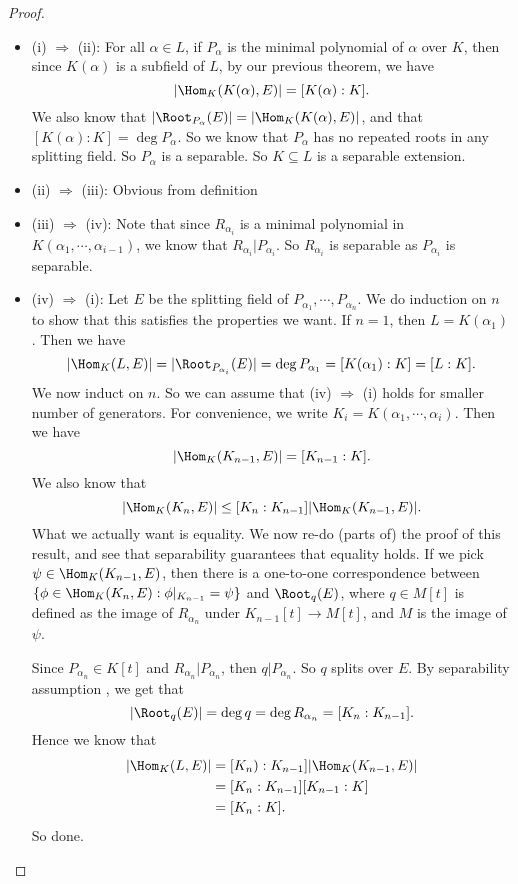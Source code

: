 \documentclass[a4paper]{article}
\begin{document}
\begin{proof}\leavevmode
  \begin{itemize}
    \item (i) $\Rightarrow$ (ii): For all $\alpha \in L$, if $P_\alpha$ is the minimal polynomial of $\alpha$ over $K$, then since $K(\alpha)$ is a subfield of $L$, by our previous theorem, we have
      \[
        |\Hom_K(K(\alpha), E)| = [K(\alpha): K].
      \]
      We also know that $|\Root_{P_\alpha}(E)| = |\Hom_K(K(\alpha), E)|$, and that $[K(\alpha): K] = \deg P_\alpha$. So we know that $P_\alpha$ has no repeated roots in any splitting field. So $P_\alpha$ is a separable. So $K\subseteq L$ is a separable extension.
    \item (ii) $\Rightarrow$ (iii): Obvious from definition
    \item (iii) $\Rightarrow$ (iv): Note that since $R_{\alpha_i}$ is a minimal polynomial in $K(\alpha_1, \cdots, \alpha_{i - 1})$, we know that $R_{\alpha_i} | P_{\alpha_i}$. So $R_{\alpha_i}$ is separable as $P_{\alpha_i}$ is separable.
    \item (iv) $\Rightarrow$ (i): Let $E$ be the splitting field of $P_{\alpha_1}, \cdots, P_{\alpha_n}$. We do induction on $n$ to show that this satisfies the properties we want. If $n = 1$, then $L = K(\alpha_1)$. Then we have
      \[
        |\Hom_K(L, E)| = |\Root_{P_{\alpha_i}}(E)| = \deg P_{\alpha_1} = [K(\alpha_1): K] = [L:K].
      \]
      We now induct on $n$. So we can assume that (iv) $\Rightarrow $ (i) holds for smaller number of generators. For convenience, we write $K_i = K(\alpha_1, \cdots, \alpha_i)$. Then we have
      \[
        |\Hom_K(K_{n - 1}, E)| = [K_{n - 1}: K].
      \]
      We also know that
      \[
        |\Hom_K(K_n, E)| \leq [K_n: K_{n - 1}] |\Hom_K(K_{n - 1}, E)|.
      \]
      What we actually want is equality. We now re-do (parts of) the proof of this result, and see that separability guarantees that equality holds. If we pick $\psi \in \Hom_K(K_{n - 1}, E)$, then there is a one-to-one correspondence between $\{\phi \in \Hom_K(K_n, E): \phi|_{K_{n - 1}} = \psi\}$ and $\Root_q(E)$, where $q \in M[t]$ is defined as the image of $R_{\alpha_n}$ under $K_{n - 1}[t] \to M[t]$, and $M$ is the image of $\psi$.

      Since $P_{\alpha_n} \in K[t]$ and $R_{\alpha_n} | P_{\alpha_n}$, then $q | P_{\alpha_n}$. So $q$ splits over $E$. By separability assumption , we get that
      \[
        |\Root_q(E)| = \deg q = \deg R_{\alpha_n} = [K_n: K_{n - 1}].
      \]
      Hence we know that
      \begin{align*}
        |\Hom_K(L, E)| &= [K_n): K_{n - 1}] | \Hom_K(K_{n - 1}, E)|\\
        &= [K_n: K_{n - 1}][K_{n - 1}: K]\\
        &= [K_n: K].
      \end{align*}
      So done.
  \end{itemize}
\end{proof}
\end{document}
